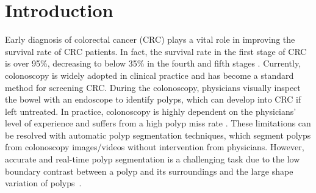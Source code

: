 \documentclass[runningheads]{llncs}
\begin{document}
\section{Introduction}
Early diagnosis of colorectal cancer (CRC) plays a vital role in improving the survival rate of CRC patients. 
In fact, the survival rate in the first stage of CRC is over 95\%, decreasing to below 35\% in the fourth and fifth stages \cite{bernal2012towards}.
Currently, colonoscopy is widely adopted in clinical practice and has become a standard method for screening CRC.
During the colonoscopy, physicians visually inspect the bowel with an endoscope to identify polyps, which can develop into CRC if left untreated.
In practice, colonoscopy is highly dependent on the physicians' level of experience and suffers from a high polyp miss rate \cite{puyal2020endoscopic}.
These limitations can be resolved with automatic polyp segmentation techniques, which segment polyps from colonoscopy images/videos without intervention from physicians.
However, accurate and real-time polyp segmentation is a challenging task due to the low boundary contrast between a polyp and its surroundings and the large shape variation of polyps~\cite{fan2020pra}.
\end{document}
